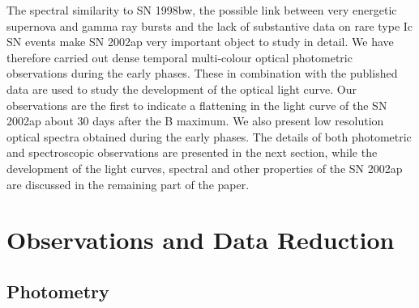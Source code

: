 The spectral similarity to SN 1998bw, the possible link between very energetic
supernova and gamma ray bursts and the lack of substantive data on rare type Ic SN events
make SN 2002ap very important object to study in
detail. We have therefore carried out dense temporal multi-colour optical
photometric observations during the early phases. These in combination with the published
data are used to study the development of the optical light curve. 
Our observations are the first to indicate a flattening in the light curve of the
SN 2002ap about 30 days after the B maximum. 
We also present low resolution optical spectra obtained during the early phases.
The details of both photometric and spectroscopic observations are presented in the 
next section, while the development of the light curves, spectral and other properties of the 
SN 2002ap are discussed in the remaining part of the paper.

\section{Observations and Data Reduction}
\subsection{Photometry}

